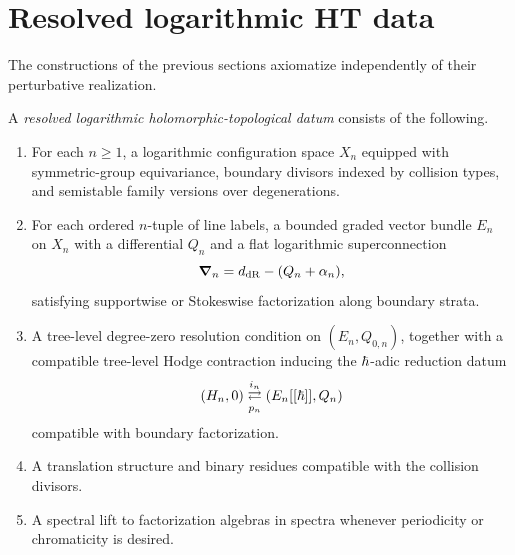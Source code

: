 \section{Resolved logarithmic HT data}\label{sec:platonic}

The constructions of the previous sections axiomatize independently of their perturbative realization.

\begin{definition}\label{def:rlht-datum}
A \emph{resolved logarithmic holomorphic-topological datum} consists of the following.
\begin{enumerate}[label=\textup{(\roman*)}]
 \item For each $n\ge 1$, a logarithmic configuration space $X_n$ equipped with symmetric-group equivariance, boundary divisors indexed by collision types, and semistable family versions over degenerations.
 \item For each ordered $n$-tuple of line labels, a bounded graded vector bundle $E_n$ on $X_n$ with a differential $Q_n$ and a flat logarithmic superconnection
 \[
 \boldsymbol{\nabla}_n = d_{\mathrm{dR}}-(Q_n+\alpha_n),
 \]
 satisfying supportwise or Stokeswise factorization along boundary strata.
 \item A tree-level degree-zero resolution condition on $(E_n,Q_{0,n})$, together with a compatible tree-level Hodge contraction inducing the $\hbar$-adic reduction datum
 \[
 (H_n,0) \underset{p_n}{\stackrel{i_n}{\rightleftarrows}} (E_n[[\hbar]],Q_n)
 \]
 compatible with boundary factorization.
 \item A translation structure and binary residues compatible with the collision divisors.
 \item A spectral lift to factorization algebras in spectra whenever periodicity or chromaticity is desired.
\end{enumerate}
\end{definition}

